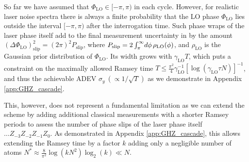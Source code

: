 
So far we have assumed that $\Phi_\mathrm{LO}\in[-\pi,\pi)$ in each cycle.
However, for realistic laser noise spectra there is always a finite probability
that the LO phase $\Phi_\mathrm{LO}$ lies outside the interval $[-\pi,\pi)$ after
the interrogation time. Such phase wraps of the laser phase itself add to the
final measurement uncertainty in  by the amount
$
	(\Delta\Phi_\mathrm{LO})^2_\mathrm{slip} =  (2\pi)^2P_\mathrm{slip}
$,
where 
$P_\mathrm{slip} = 2\intop_\pi^\infty \d{\phi} \rho_\mathrm{LO}(\phi)$,
and $\rho_\mathrm{LO}$ is the Gaussian prior distribution of $\Phi_\mathrm{LO}$.
Its width grows with $ \gamma_\mathrm{LO} T$, which puts a constraint on the
maximally allowed Ramsey time $T
\leq\frac{\pi^2}{4}\gamma_\mathrm{LO}^{-1}[\log(\gamma_\mathrm{LO}\tau N)]^{-1}$,
and thus the achievable ADEV $\sigma_y~(\propto 1/\sqrt T)$
 as we demonstrate in Appendix \ref{app:GHZ_cascade}.

This, however, does not represent a fundamental limitation as we can
extend the scheme by adding additional classical measurements with a shorter
Ramsey periods to assess the number of phase slips of
the laser phase itself $\hdots Z_{-3}Z_{-2}Z_{-1}Z_0$. As demonstrated in
Appendix \ref{app:GHZ_cascade}, this allows  extending the Ramsey time by a
factor $k$ adding only a negligible number of atoms $N^{*}\approx
\frac{8}{\pi^2} \log\left(k N^2\right)\log_2(k)\ll N$.

 
